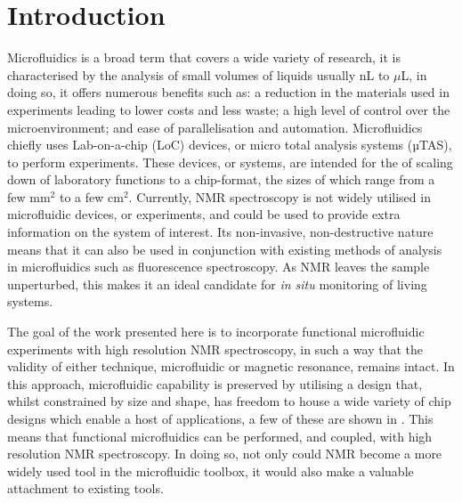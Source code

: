 
\chapter{Introduction}\label{Introduction}

Microfluidics is a broad term that covers a wide variety of research, it is characterised by
the analysis of small volumes of liquids usually nL to $\mu$L, in doing so, it offers numerous benefits
such as: a reduction in the materials used in experiments leading to lower costs and less waste; a high
level of control over the microenvironment; and ease of parallelisation and automation.
Microfluidics chiefly uses Lab-on-a-chip (LoC) devices, or micro total analysis
systems (µTAS), to perform experiments. These devices, or systems, are intended for the of scaling down of
laboratory functions to a chip-format, the sizes of which range from a few mm$^2$ to a few cm$^2$.
Currently, NMR spectroscopy is not widely utilised in microfluidic devices, or experiments, and could be
used to provide extra information on the system of interest. Its non-invasive, non-destructive nature means that it
can also be used in conjunction with existing methods of analysis in microfluidics such as fluorescence spectroscopy.
As NMR leaves the sample unperturbed, this makes it an ideal candidate for \textit{in situ} monitoring of
living systems.

The goal of the work presented here is to incorporate functional microfluidic experiments with high
resolution NMR spectroscopy, in such a way that the validity of either technique, microfluidic or magnetic
resonance, remains intact. In this approach, microfluidic capability is preserved by utilising a design
that, whilst constrained by size and shape, has freedom to house a wide variety of chip designs which enable
a host of applications, a few of these are shown in . This means that functional
microfluidics can be performed, and coupled, with high resolution NMR spectroscopy. In doing so, not only
could NMR become a more widely used tool in the microfluidic toolbox, it would also make a valuable
attachment to existing tools.

